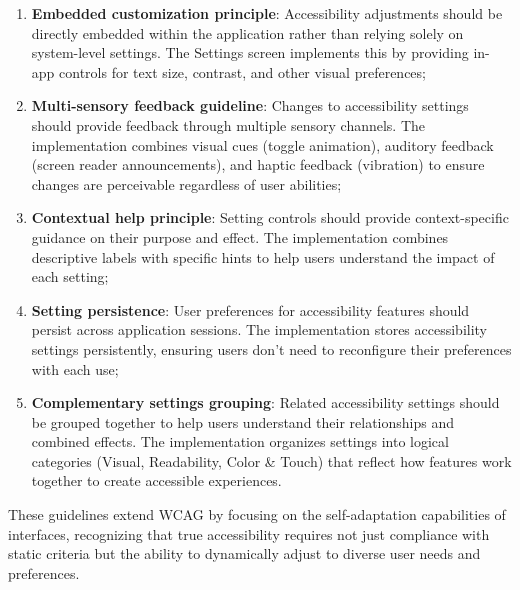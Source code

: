 \begin{enumerate}
    \item \textbf{Embedded customization principle}: Accessibility adjustments should be directly embedded within the application rather than relying solely on system-level settings. The Settings screen implements this by providing in-app controls for text size, contrast, and other visual preferences;
    
    \item \textbf{Multi-sensory feedback guideline}: Changes to accessibility settings should provide feedback through multiple sensory channels. The implementation combines visual cues (toggle animation), auditory feedback (screen reader announcements), and haptic feedback (vibration) to ensure changes are perceivable regardless of user abilities;
    
    \item \textbf{Contextual help principle}: Setting controls should provide context-specific guidance on their purpose and effect. The implementation combines descriptive labels with specific hints to help users understand the impact of each setting;
    
    \item \textbf{Setting persistence}: User preferences for accessibility features should persist across application sessions. The implementation stores accessibility settings persistently, ensuring users don't need to reconfigure their preferences with each use;
    
    \item \textbf{Complementary settings grouping}: Related accessibility settings should be grouped together to help users understand their relationships and combined effects. The implementation organizes settings into logical categories (Visual, Readability, Color \& Touch) that reflect how features work together to create accessible experiences.
\end{enumerate}

These guidelines extend WCAG by focusing on the self-adaptation capabilities of interfaces, recognizing that true accessibility requires not just compliance with static criteria but the ability to dynamically adjust to diverse user needs and preferences.

\newpage

